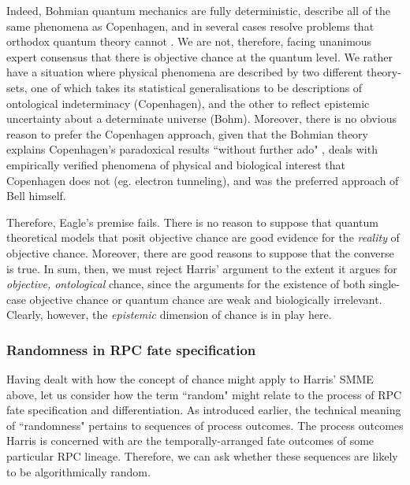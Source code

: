 \documentclass{ut-thesis}
\begin{document}
\begin{NoHyper}
Indeed, Bohmian quantum mechanics are fully deterministic, describe all of the same phenomena as Copenhagen, and in several cases resolve problems that orthodox quantum theory cannot \cite{Goldstein2017}. We are not, therefore, facing unanimous expert consensus that there is objective chance at the quantum level. We rather have a situation where physical phenomena are  described by two different theory-sets, one of which takes its statistical generalisations to be descriptions of ontological indeterminacy (Copenhagen), and the other to reflect epistemic uncertainty about a determinate universe (Bohm). Moreover, there is no obvious reason to prefer the Copenhagen approach, given that the Bohmian theory explains Copenhagen's paradoxical results ``without further ado" \cite{Goldstein2017}, deals with empirically verified phenomena of physical and biological interest that Copenhagen does not (eg. electron tunneling), and was the preferred approach of Bell himself.

Therefore, Eagle's premise fails. There is no reason to suppose that quantum theoretical models that posit objective chance are good evidence for the \textit{reality} of objective chance. Moreover, there are good reasons to suppose that the converse is true. In sum, then, we must reject Harris' argument to the extent it argues for \textit{objective, ontological} chance, since the arguments for the existence of both single-case objective chance or quantum chance are weak and biologically irrelevant. Clearly, however, the \textit{epistemic} dimension of chance is in play here.

\subsubsection{Randomness in RPC fate specification}

Having dealt with how the concept of chance might apply to Harris' SMME above, let us consider how the term ``random" might relate to the process of RPC fate specification and differentiation. As introduced earlier, the technical meaning of ``randomness" pertains to sequences of process outcomes. The process outcomes Harris is concerned with are the temporally-arranged fate outcomes of some particular RPC lineage. Therefore, we can ask whether these sequences are likely to be algorithmically random.


\end{NoHyper}
\end{document}
